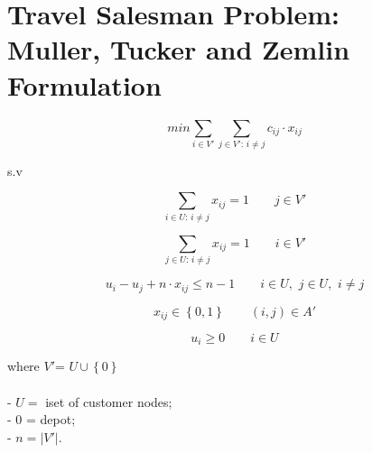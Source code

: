 \documentclass[a4paper,12pt,titlepage]{article}
\begin{document}
\section*{Travel Salesman Problem:\\
	\large{Muller, Tucker and Zemlin Formulation}}

\begin{equation}
min \sum_{i\in V'}\sum_{j\in V':\,i\neq j} c_{ij}\cdot x_{ij}
\end{equation}

\begin{center}
	s.v
\end{center}

\begin{equation}
\sum_{i\in U:\,i\neq j}x_{ij}=1\qquad j \in V'
\label{a}
\end{equation}

\begin{equation}
\sum_{j\in U:\,i\neq j}x_{ij}=1\qquad i \in V'
\label{b}
\end{equation}

\begin{equation}
u_i -u_j + n\cdot x_{ij}\leq n-1\qquad i \in U,\,\, j\in U,\,\, i\neq j
\label{sub-tour}
\end{equation}

\begin{equation}
x_{ij} \in \left\lbrace 0,1\right\rbrace \qquad (i,j) \in A'
\end{equation}

\begin{equation}
u_i \geq 0 \qquad i\in U
\end{equation}

where $V'$= $U$\,$\cup$\,$\left\lbrace 0\right\rbrace$\\
\\
- $U=$ iset of customer nodes;\\
- $0$ = depot;\\
- $n = |V'|$.
\end{document}
